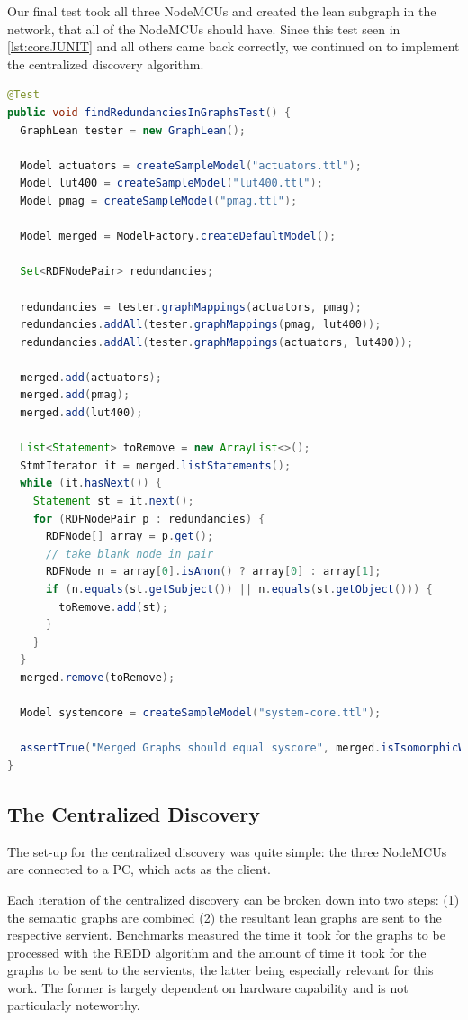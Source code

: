 Our final test took all three NodeMCUs and created the lean subgraph in the network, that all of the NodeMCUs should have. Since this test seen in \ref{lst:coreJUNIT} and all others came back correctly, we continued on to implement the centralized discovery algorithm.

\begin{lstlisting}[language=java, caption={The final test, which checked that the semantic data was being connected, as previously expected.}, label={lst:coreJUNIT}]
@Test
public void findRedundanciesInGraphsTest() {
  GraphLean tester = new GraphLean();

  Model actuators = createSampleModel("actuators.ttl");
  Model lut400 = createSampleModel("lut400.ttl");
  Model pmag = createSampleModel("pmag.ttl");

  Model merged = ModelFactory.createDefaultModel();

  Set<RDFNodePair> redundancies;

  redundancies = tester.graphMappings(actuators, pmag);
  redundancies.addAll(tester.graphMappings(pmag, lut400));
  redundancies.addAll(tester.graphMappings(actuators, lut400));

  merged.add(actuators);
  merged.add(pmag);
  merged.add(lut400);

  List<Statement> toRemove = new ArrayList<>();
  StmtIterator it = merged.listStatements();
  while (it.hasNext()) {
    Statement st = it.next();
    for (RDFNodePair p : redundancies) {
      RDFNode[] array = p.get();
      // take blank node in pair
      RDFNode n = array[0].isAnon() ? array[0] : array[1];
      if (n.equals(st.getSubject()) || n.equals(st.getObject())) {
        toRemove.add(st);
      }
    }
  }
  merged.remove(toRemove);

  Model systemcore = createSampleModel("system-core.ttl");

  assertTrue("Merged Graphs should equal syscore", merged.isIsomorphicWith(systemcore));
}
\end{lstlisting}



\subsection{The Centralized Discovery}

The set-up for the centralized discovery was quite simple: the three NodeMCUs are connected to a PC, which acts as the client.

Each iteration of the centralized discovery can be broken down into two steps: (1) the semantic graphs are combined (2) the resultant lean graphs are sent to the respective servient. Benchmarks measured the time it took for the graphs to be processed with the REDD algorithm and the amount of time it took for the graphs to be sent to the servients, the latter being especially relevant for this work. The former is largely dependent on hardware capability and is not particularly noteworthy.

